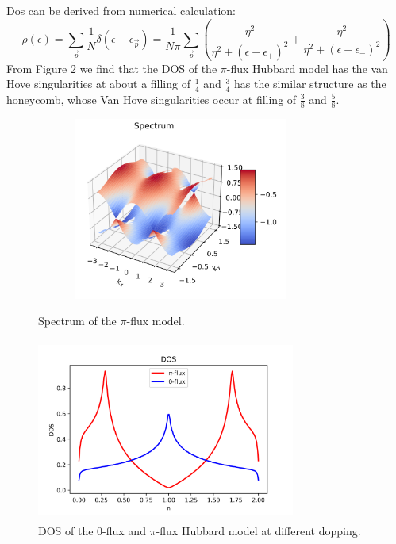 \documentclass[12pt]{article}
\numberwithin{equation}{section}
\begin{document}
Dos can be derived from numerical calculation:
\begin{equation}
\rho(\epsilon) = \sum_{\vec{p}}\frac{1}{N}\delta(\epsilon-\epsilon_{\vec{p}})=\frac{1}{N\pi}\sum_{\vec{p}}\left(\frac{\eta^2}{\eta^2+(\epsilon-\epsilon_+)^2}+\frac{\eta^2}{\eta^2+(\epsilon-\epsilon_-)^2}\right)
\end{equation}
From Figure 2 we find that the DOS of the $\pi$-flux Hubbard model has the van Hove singularities at about a filling of $\frac{1}{4}$ and $\frac{3}{4}$ has the similar structure as the honeycomb, whose Van Hove singularities occur at filling of $\frac{3}{8}$ and $\frac{5}{8}$.
\begin{figure}[htbp]
	\begin{minipage}[t]{0.4\linewidth}
	\centering
	\includegraphics[height=6cm, width=9.5cm]{Spectrum.jpg}
	\caption{Spectrum of the $\pi$-flux model.}
	\end{minipage}
	\hfill
	\begin{minipage}[t]{0.5\linewidth}
	\centering
	\includegraphics[height=6cm,width=8.5cm]{DOS.png}
	\caption{DOS of the 0-flux and $\pi$-flux Hubbard model at different dopping.}
	\end{minipage}
\end{figure}
\end{document}
